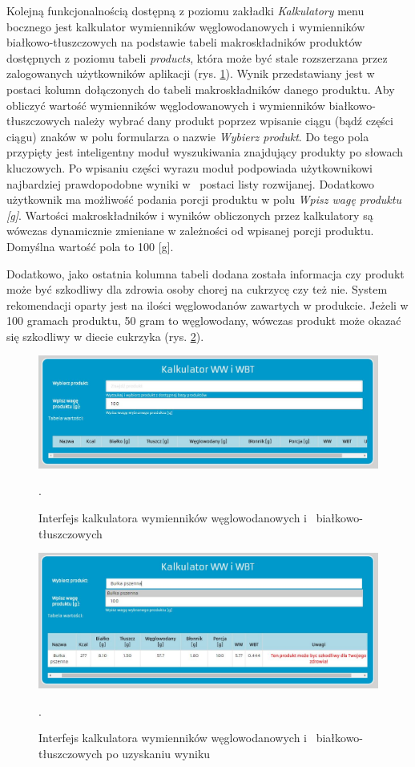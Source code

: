 Kolejną funkcjonalnością dostępną z poziomu zakładki \textit{Kalkulatory} menu bocznego jest kalkulator wymienników węglowodanowych i wymienników białkowo-tłuszczowych na podstawie tabeli makroskładników produktów dostępnych z poziomu tabeli \textit{products}, która może być stale rozszerzana przez zalogowanych użytkowników aplikacji (rys. \ref{Rys:wwBefore}). Wynik przedstawiany jest w postaci kolumn dołączonych do tabeli makroskładników danego produktu. Aby obliczyć wartość wymienników węglodowanowych i wymienników białkowo-tłuszczowych należy wybrać dany produkt poprzez wpisanie ciągu (bądź części ciągu) znaków w polu formularza o nazwie \textit{Wybierz produkt}. Do tego pola przypięty jest inteligentny moduł wyszukiwania znajdujący produkty po słowach kluczowych. Po wpisaniu części wyrazu moduł podpowiada użytkownikowi najbardziej prawdopodobne wyniki w~ postaci listy rozwijanej. Dodatkowo użytkownik ma możliwość podania porcji produktu w polu \textit{Wpisz wagę produktu [g]}. Wartości makroskładników i wyników obliczonych przez kalkulatory są wówczas dynamicznie zmieniane w zależności od wpisanej porcji produktu. Domyślna wartość pola to 100 [g]. 

Dodatkowo, jako ostatnia kolumna tabeli dodana została informacja czy produkt może być szkodliwy dla zdrowia osoby chorej na cukrzycę czy też nie. System rekomendacji oparty jest na ilości węglowodanów zawartych w produkcie. Jeżeli w 100 gramach produktu, 50 gram to węglowodany, wówczas produkt może okazać się szkodliwy w diecie cukrzyka (rys. \ref{Rys:wwAfter}). 

\begin{figure}[h]
	\centering\includegraphics[scale=0.5]{images/ww_before.jpg}
	\caption{Interfejs kalkulatora wymienników węglowodanowych i~ białkowo-tłuszczowych}.
	\label{Rys:wwBefore}
\end{figure}

\begin{figure}[h]
	\centering\includegraphics[scale=0.5]{images/ww_after.jpg}
	\caption{Interfejs kalkulatora wymienników węglowodanowych i~ białkowo-tłuszczowych po uzyskaniu wyniku}.
	\label{Rys:wwAfter}
\end{figure}

